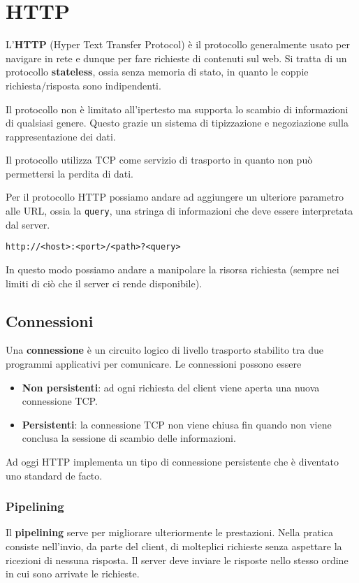 \section{HTTP}
L'\textbf{HTTP} (Hyper Text Transfer Protocol) è il protocollo 
generalmente usato per navigare in rete e dunque per fare richieste di 
contenuti sul web. Si tratta di un protocollo \textbf{stateless}, ossia
senza memoria di stato, in quanto le coppie richiesta/risposta sono
indipendenti.

Il protocollo non è limitato all'ipertesto ma supporta lo scambio di 
informazioni di qualsiasi genere. Questo grazie un sistema di 
tipizzazione e negoziazione sulla rappresentazione dei dati.

Il protocollo utilizza TCP come servizio di trasporto in quanto non può
permettersi la perdita di dati.

Per il protocollo HTTP possiamo andare ad aggiungere un ulteriore 
parametro alle URL, ossia la \verb|query|, una stringa di informazioni 
che deve essere interpretata dal server.
\begin{center}
	\verb|http://<host>:<port>/<path>?<query>|
\end{center}
In questo modo possiamo andare a manipolare la risorsa richiesta 
(sempre nei limiti di ciò che il server ci rende disponibile).

\subsection{Connessioni}
Una \textbf{connessione} è un circuito logico di livello trasporto 
stabilito tra due programmi applicativi per comunicare. Le connessioni 
possono essere
\begin{itemize}
	\item \textbf{Non persistenti}: ad ogni richiesta del client viene 
		aperta una nuova connessione TCP.
	\item \textbf{Persistenti}: la connessione TCP non viene chiusa fin
		quando non viene conclusa la sessione di scambio delle 
		informazioni.
\end{itemize}
Ad oggi HTTP implementa un tipo di connessione persistente che è 
diventato uno standard de facto.

\subsubsection{Pipelining}
Il \textbf{pipelining} serve per migliorare ulteriormente le 
prestazioni. Nella pratica consiste nell'invio, da parte del client,
di molteplici richieste senza aspettare la ricezioni di nessuna 
risposta. Il server deve inviare le risposte nello stesso ordine in cui
sono arrivate le richieste.

